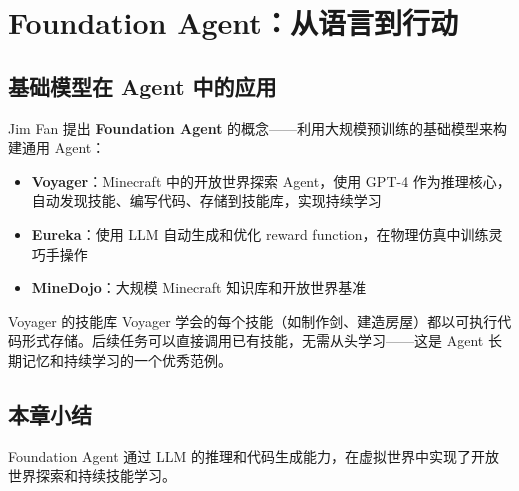 \section{Foundation Agent：从语言到行动}

\subsection{基础模型在 Agent 中的应用}

Jim Fan 提出 \textbf{Foundation Agent} 的概念——利用大规模预训练的基础模型来构建通用 Agent：

\begin{itemize}
    \item \textbf{Voyager}：Minecraft 中的开放世界探索 Agent，使用 GPT-4 作为推理核心，自动发现技能、编写代码、存储到技能库，实现持续学习
    \item \textbf{Eureka}：使用 LLM 自动生成和优化 reward function，在物理仿真中训练灵巧手操作
    \item \textbf{MineDojo}：大规模 Minecraft 知识库和开放世界基准
\end{itemize}

\begin{knowledgebox}{Voyager 的技能库}
Voyager 学会的每个技能（如制作剑、建造房屋）都以可执行代码形式存储。后续任务可以直接调用已有技能，无需从头学习——这是 Agent 长期记忆和持续学习的一个优秀范例。
\end{knowledgebox}

\subsection{本章小结}

Foundation Agent 通过 LLM 的推理和代码生成能力，在虚拟世界中实现了开放世界探索和持续技能学习。

